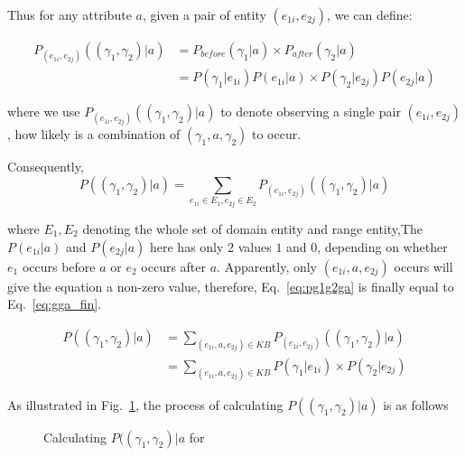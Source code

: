 Thus for any attribute $a$, given a pair of entity $(e_{1i},e_{2j})$, we can define:

\begin{equation} \begin{split} P_{(e_{1i},e_{2j})}((\gamma_{1},\gamma_{2}) |a)&=P_{before}(\gamma_1|a) \times P_{after}(\gamma_2|a) \\&=  P(\gamma_{1}|e_{1i}) P(e_{1i}|a) \times P(\gamma_{2}|e_{2j})P(e_{2j}|a) \end{split} \label{eq:giga}\end{equation}


where we use $P_{(e_{1i},e_{2j})}((\gamma_{1},\gamma_{2}) |a)$ to denote observing a single pair $(e_{1i},e_{2j})$, how likely is a combination of $(\gamma_{1},a,\gamma_{2})$ to occur.

Consequently,
\begin{equation} P((\gamma_{1},\gamma_{2}) |a)=\sum_{  e_{1i} \in E_1 ,e_{2j} \in E_2} P_{(e_{1i},e_{2j})}((\gamma_{1},\gamma_{2}) |a) \label{eq:pg1g2ga}\end{equation}

where $E_1,E_2$ denoting the whole set of domain entity and range entity,The  $P(e_{1i}|a)$ and $P(e_{2j}|a)$ here has only 2 values $1$ and  $0$, depending on whether  $e_1$ occurs before $a$ or $e_2$ occurs after $a$. Apparently, only $(e_{1i}, a, e_{2j})$ occurs will give the equation a non-zero value, therefore, Eq.~\ref{eq:pg1g2ga} is finally equal to Eq.~\ref{eq:gga_fin}.

\begin{equation} \begin{split} P((\gamma_{1},\gamma_{2}) |a) &= \sum_{  (e_{1i},a,e_{2j})\in KB } P_{(e_{1i},e_{2j})}((\gamma_{1},\gamma_{2}) |a) \\&=  \sum_{  (e_{1i},a,e_{2j})\in KB }P(\gamma_{1}|e_{1i}) \times P(\gamma_{2}|e_{2j})\end{split} \label{eq:gga_fin}\end{equation}


\begin{example}
\label{exa:pggga}
As illustrated in Fig.~\ref{fig:bipartite}, the process of calculating $P((\gamma_{1},\gamma_{2}) |a)$ is as follows\term{}
\end{example}


\begin{figure}[!htb]
\centering {}
\caption{Calculating $P((\gamma_{1},\gamma_{2}) |a$ for \term{}} \label{fig:bipartite}
\end{figure}

